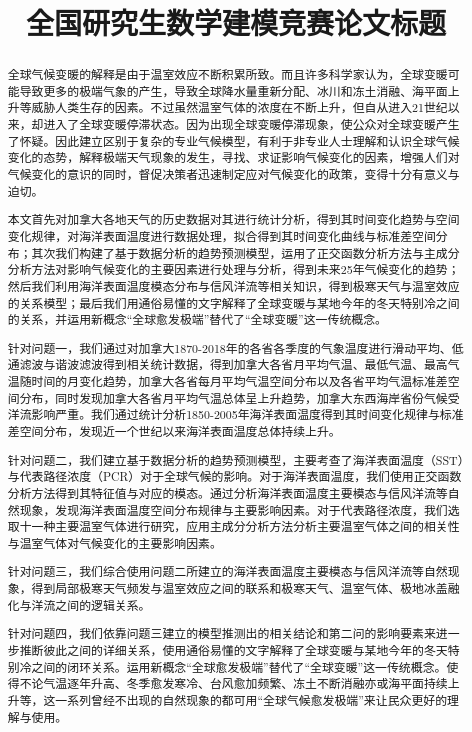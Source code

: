 \documentclass[bwprint]{gmcmthesis}
\title{全国研究生数学建模竞赛论文标题}
\begin{document}
 \maketitle

\begin{abstract}
全球气候变暖的解释是由于温室效应不断积累所致。而且许多科学家认为，全球变暖可能导致更多的极端气象的产生，导致全球降水量重新分配、冰川和冻土消融、海平面上升等威胁人类生存的因素。不过虽然温室气体的浓度在不断上升，但自从进入21世纪以来，却进入了全球变暖停滞状态。因为出现全球变暖停滞现象，使公众对全球变暖产生了怀疑。因此建立区别于复杂的专业气候模型，有利于非专业人士理解和认识全球气候变化的态势，解释极端天气现象的发生，寻找、求证影响气候变化的因素，增强人们对气候变化的意识的同时，督促决策者迅速制定应对气候变化的政策，变得十分有意义与迫切。

本文首先对加拿大各地天气的历史数据对其进行统计分析，得到其时间变化趋势与空间变化规律，对海洋表面温度进行数据处理，拟合得到其时间变化曲线与标准差空间分布；其次我们构建了基于数据分析的趋势预测模型，运用了正交函数分析方法与主成分分析方法对影响气候变化的主要因素进行处理与分析，得到未来25年气候变化的趋势；然后我们利用海洋表面温度模态分布与信风洋流等相关知识，得到极寒天气与温室效应的关系模型；最后我们用通俗易懂的文字解释了全球变暖与某地今年的冬天特别冷之间的关系，并运用新概念“全球愈发极端”替代了“全球变暖”这一传统概念。

针对问题一，我们通过对加拿大1870-2018年的各省各季度的气象温度进行滑动平均、低通滤波与谐波滤波得到相关统计数据，得到加拿大各省月平均气温、最低气温、最高气温随时间的月变化趋势，加拿大各省每月平均气温空间分布以及各省平均气温标准差空间分布，同时发现加拿大各省月平均气温总体呈上升趋势，加拿大东西海岸省份气候受洋流影响严重。我们通过统计分析1850-2005年海洋表面温度得到其时间变化规律与标准差空间分布，发现近一个世纪以来海洋表面温度总体持续上升。

针对问题二，我们建立基于数据分析的趋势预测模型，主要考查了海洋表面温度（SST）与代表路径浓度（PCR）对于全球气候的影响。对于海洋表面温度，我们使用正交函数分析方法得到其特征值与对应的模态。通过分析海洋表面温度主要模态与信风洋流等自然现象，发现海洋表面温度空间分布规律与主要影响因素。对于代表路径浓度，我们选取十一种主要温室气体进行研究，应用主成分分析方法分析主要温室气体之间的相关性与温室气体对气候变化的主要影响因素。

针对问题三，我们综合使用问题二所建立的海洋表面温度主要模态与信风洋流等自然现象，得到局部极寒天气频发与温室效应之间的联系和极寒天气、温室气体、极地冰盖融化与洋流之间的逻辑关系。

针对问题四，我们依靠问题三建立的模型推测出的相关结论和第二问的影响要素来进一步推断彼此之间的详细关系，使用通俗易懂的文字解释了全球变暖与某地今年的冬天特别冷之间的闭环关系。运用新概念“全球愈发极端”替代了“全球变暖”这一传统概念。使得不论气温逐年升高、冬季愈发寒冷、台风愈加频繁、冻土不断消融亦或海平面持续上升等，这一系列曾经不出现的自然现象的都可用“全球气候愈发极端”来让民众更好的理解与使用。


\end{abstract}
\end{document}

